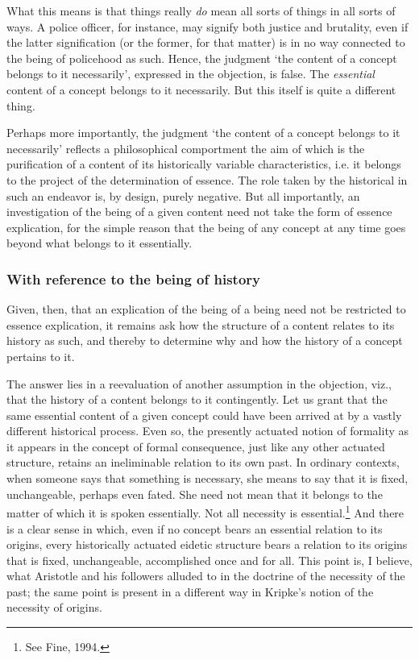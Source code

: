 \documentclass[]{article}
\begin{document}
What this means is that things really \textit{do} mean all sorts of things in all sorts of ways. A police officer, for instance, may signify both justice and brutality, even if the latter signification (or the former, for that matter) is in no way connected to the being of policehood as such. Hence, the judgment `the content of a concept belongs to it necessarily', expressed in the objection, is false. The \textit{essential} content of a concept belongs to it necessarily. But this itself is quite a different thing.

Perhaps more importantly, the judgment `the content of a concept belongs to it necessarily' reflects a philosophical comportment the aim of which is the purification of a content of its historically variable characteristics, i.e. it belongs to the project of the determination of essence. The role taken by the historical in such an endeavor is, by design, purely negative. But all importantly, an investigation of the being of a given content need not take the form of essence explication, for the simple reason that the being of any concept at any time goes beyond what belongs to it essentially.

\subsubsection{With reference to the being of history}

Given, then, that an explication of the being of a being need not be restricted to essence explication, it remains ask how the structure of a content relates to its history as such, and thereby to determine why and how the history of a concept pertains to it.

The answer lies in a reevaluation of another assumption in the objection, viz., that the history of a content belongs to it contingently. Let us grant that the same essential content of a given concept could have been arrived at by a vastly different historical process. Even so, the presently actuated notion of formality as it appears in the concept of formal consequence, just like any other actuated structure, retains an ineliminable relation to its own past. In ordinary contexts, when someone says that something is necessary, she means to say that it is fixed, unchangeable, perhaps even fated. She need not mean that it belongs to the matter of which it is spoken essentially. Not all necessity is essential.\footnote{See Fine, 1994.} And there is a clear sense in which, even if no concept bears an essential relation to its origins, every historically actuated eidetic structure bears a relation to its origins that is fixed, unchangeable, accomplished once and for all. This point is, I believe, what Aristotle and his followers alluded to in the doctrine of the necessity of the past; the same point is present in a different way in Kripke's notion of the necessity of origins.
\end{document}
